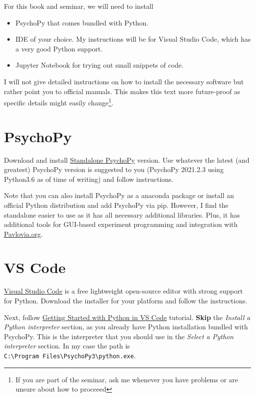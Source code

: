 \documentclass[
]{book}
\providecommand{\tightlist}{%
  \setlength{\itemsep}{0pt}\setlength{\parskip}{0pt}}
\begin{document}
For this book and seminar, we will need to install

\begin{itemize}
\tightlist
\item
  PsychoPy that comes bundled with Python.
\item
  IDE of your choice. My instructions will be for Visual Studio Code, which has a very good Python support.
\item
  Jupyter Notebook for trying out small snippets of code.
\end{itemize}

I will not give detailed instructions on how to install the necessary software but rather point you to official manuals. This makes this text more future-proof as specific details might easily change\footnote{If you are part of the seminar, ask me whenever you have problems or are unsure about how to proceeed}.

\hypertarget{install-psychopy}{%
\section{PsychoPy}\label{install-psychopy}}

Download and install \href{https://www.psychopy.org/download.html}{Standalone PsychoPy} version. Use whatever the latest (and greatest) PsychoPy version is suggested to you (PsychoPy 2021.2.3 using Python3.6 as of time of writing) and follow instructions.

Note that you can also install PsychoPy as a anaconda package or install an official Python distribution and add PsychoPy via pip. However, I find the standalone easier to use as it has all necessary additional libraries. Plus, it has additional tools for GUI-based experiment programming and integration with \href{https://pavlovia.org/}{Pavlovia.org}.

\hypertarget{install-vs-code}{%
\section{VS Code}\label{install-vs-code}}

\href{https://code.visualstudio.com/}{Visual Studio Code} is a free lightweight open-source editor with strong support for Python. Download the installer for your platform and follow the instructions.

Next, follow \href{https://code.visualstudio.com/docs/python/python-tutorial}{Getting Started with Python in VS Code} tutorial. \textbf{Skip} the \emph{Install a Python interpreter} section, as you already have Python installation bundled with PsychoPy. This is the interpreter that you should use in the \emph{Select a Python interpreter} section. In my case the path is \texttt{C:\textbackslash{}Program\ Files\textbackslash{}PsychoPy3\textbackslash{}python.exe}.
\end{document}
